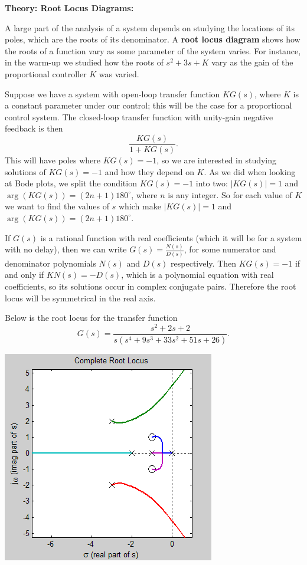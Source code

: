 \documentclass{article}
\begin{document}
\clearpage






\textbf{Theory: Root Locus Diagrams:}\bigskip

A large part of the analysis of a system depends on studying the locations of its poles, which are the roots of its denominator. A \textbf{root locus diagram} shows how the roots of a function vary as some parameter of the system varies. For instance, in the warm-up we studied how the roots of $s^2+3s+K$ vary as the gain of the proportional controller $K$ was varied.

Suppose we have a system with open-loop transfer function $KG(s)$, where $K$ is a constant parameter under our control; this will be the case for a proportional control system. The closed-loop transfer function with unity-gain negative feedback is then
\[\frac{KG(s)}{1+KG(s)}.\]
This will have poles where $KG(s)=-1$, so we are interested in studying solutions of $KG(s)=-1$ and how they depend on $K$. As we did when looking at Bode plots, we split the condition $KG(s)=-1$ into two: $|KG(s)|=1$ and $\arg(KG(s))=(2n+1)180^\circ$, where $n$ is any integer. So for each value of $K$ we want to find the values of $s$ which make $|KG(s)|=1$ and $\arg(KG(s))=(2n+1)180^\circ$.

If $G(s)$ is a rational function with real coefficients (which it will be for a system with no delay), then we can write $G(s)=\frac{N(s)}{D(s)}$, for some numerator and denominator polynomials $N(s)$ and $D(s)$ respectively. Then $KG(s)=-1$ if and only if $KN(s)=-D(s)$, which is a polynomial equation with real coefficients, so its solutions occur in complex conjugate pairs. Therefore the root locus will be symmetrical in the real axis.\medskip

Below is the root locus for the transfer function
\[G(s)=\frac{s^2+2s+2}{s(s^4+9s^3+33s^2+51s+26)}.\]


\begin{center}
	\includegraphics[scale=0.5]{RLTotal.png}
\end{center}
\end{document}
